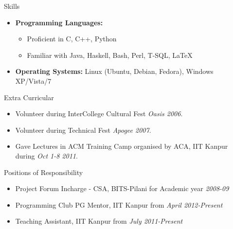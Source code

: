 \documentclass[10pt]{article}
\newenvironment{ressection}[1]{
	\vspace{4pt}
	{\fontfamily{phv}\selectfont\Large#1}
	\begin{itemize}
	\vspace{3pt}
}{
	\end{itemize}
}
\newcommand{\resitem}[1]{
	\vspace{-4pt}
	\item \begin{flushleft} #1 \end{flushleft}
}
\newcommand{\ressubitem}[1]{
	\vspace{-1pt}
	\item \begin{flushleft} #1 \end{flushleft}
}
\newenvironment{reslist}[1]{
	\resitem{\textbf{#1}}
	\vspace{-5pt}
	\begin{itemize}
}{
	\end{itemize}
}
\begin{document}
\begin{ressection}{Skills}

	\begin{reslist}{Programming Languages:}

		\ressubitem{Proficient in C, C++, Python}

		\ressubitem{Familiar with Java, Haskell, Bash, Perl, T-SQL, \LaTeX }

	\end{reslist}




	    





	\resitem{\textbf{Operating Systems:} Linux (Ubuntu, Debian, Fedora), Windows XP/Vista/7}

\end{ressection}


\begin{ressection}{Extra Curricular}
 \resitem{Volunteer during InterCollege Cultural Fest \textit{Oasis 2006}.}
 \resitem{Volunteer during Technical Fest \textit{Apogee 2007}.}
 \resitem{Gave Lectures in ACM Training Camp organised by ACA, IIT Kanpur during \textit{Oct 1-8 2011}.}
\end{ressection}


\begin{ressection}{Positions of Responsibility}
 \resitem{Project Forum Incharge - CSA, BITS-Pilani for Academic year \textit{2008-09}}
 \resitem{Programming Club PG Mentor, IIT Kanpur from \textit{April 2012-Present} }
 \resitem{Teaching Assistant, IIT Kanpur from \textit{July 2011-Present} }
\end{ressection}
\end{document}
